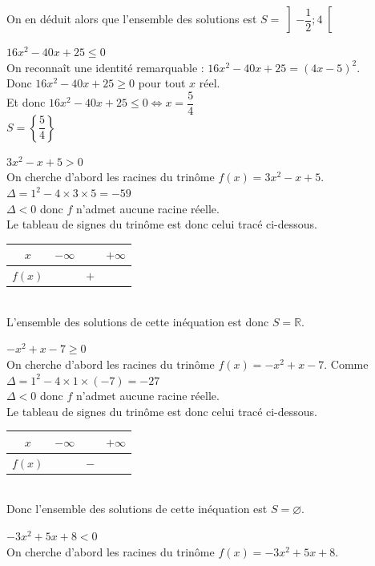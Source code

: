 \documentclass[12pt,a4paper]{book}
\begin{document}
\begin{enumMet}
    On en déduit alors que l'ensemble des solutions est $S=\left]-\dfrac{1}{2} ; 4\right[$
    \item $16 x^{2}-40 x+25 \leq 0$\\
    On reconnaît une identité remarquable : $16 x^{2}-40 x+25=(4 x-5)^{2}$.\\
    Donc $16 x^{2}-40 x+25 \geqslant 0$ pour tout $x$ réel. \\
    Et donc $16 x^{2}-40 x+25 \leqslant 0 \Leftrightarrow x=\dfrac{5}{4}$\\
    $S=\left\{\dfrac{5}{4}\right\}$
    \item $3 x^{2}-x+5>0$\\
    On cherche d'abord les racines du trinôme $f(x)=3 x^{2}-x+5$.\\
    $\Delta=1^{2}-4 \times 3 \times 5=-59$ \\
    $\Delta<0$ donc $f$ n'admet aucune racine réelle.\\ 
    Le tableau de signes du trinôme est donc celui tracé ci-dessous.\\
    \begin{tabular}{|c|lll|}
    \hline$x$ & $-\infty$ & & $+\infty$ \\
    \hline$f(x)$ & & $+$ & \\
    \hline
    \end{tabular}\\
    L'ensemble des solutions de cette inéquation est donc $S=\mathbb{R}$.
    \item $-x^{2}+x-7 \geqslant 0$\\
    On cherche d'abord les racines du trinôme $f(x)=-x^{2}+x-7$. Comme $\Delta=1^{2}-4 \times 1 \times(-7)=-27$\\
    $\Delta<0$ donc $f$ n'admet aucune racine réelle.\\ 
    Le tableau de signes du trinôme est donc celui tracé ci-dessous.\\
    \begin{tabular}{|c|lll|}
    \hline$x$ & $-\infty$ & & $+\infty$ \\
    \hline$f(x)$ & & $-$ & \\
    \hline
    \end{tabular}\\
    Donc l'ensemble des solutions de cette inéquation est $S=\varnothing$.
    \item $-3 x^{2}+5 x+8<0$\\
    On cherche d'abord les racines du trinôme $f(x)=-3 x^{2}+5 x+8$.\\

\end{enumMet}
\end{document}
